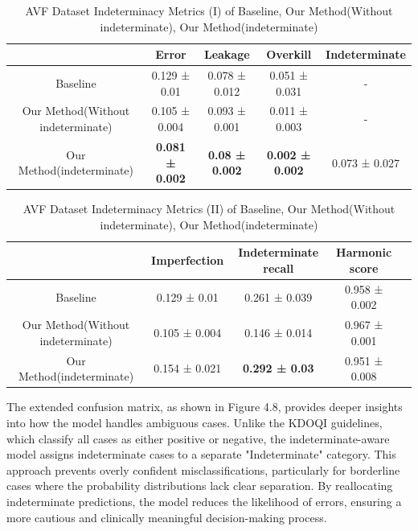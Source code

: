 \begin{table}[h]
\centering
\caption[AVF Dataset Indeterminacy Metrics (I) of Baseline, Our Method(Without indeterminate), Our Method(indeterminate)]{AVF Dataset Indeterminacy Metrics (I) of Baseline, Our Method(Without indeterminate), Our Method(indeterminate)}
\label{Indeterminacy Metrics(I) AVF}
\begin{tabular}{ccccc}
\toprule[1.1pt]
                      & Error & Leakage & Overkill & Indeterminate \\
\midrule[1.1pt]
\multirow{1}{*}{Baseline} & 0.129 ± 0.01 & 0.078 ± 0.012 & 0.051 ± 0.031 & - \\
\midrule
\multirow{1}{*}{Our Method(Without indeterminate)} & 0.105 ± 0.004 & 0.093 ± 0.001 & 0.011 ± 0.003 & - \\
\midrule
\multirow{1}{*}{Our Method(indeterminate)} & \textbf{0.081 ± 0.002} & \textbf{0.08 ± 0.002} & \textbf{0.002 ± 0.002} & 0.073 ± 0.027 \\

\bottomrule[1.1pt]
\end{tabular}
\end{table}

\begin{table}[H]
\centering
\caption[AVF Dataset Indeterminacy Metrics (II) of Baseline, Our Method(Without indeterminate), Our Method(indeterminate)]{AVF Dataset Indeterminacy Metrics (II) of Baseline, Our Method(Without indeterminate), Our Method(indeterminate)}
\label{Indeterminacy Metrics(II) AVF}
\begin{tabular}{ccccc}
\toprule[1.1pt]
                      & Imperfection & Indeterminate recall & Harmonic score \\
\midrule[1.1pt]
\multirow{1}{*}{Baseline} & 0.129 ± 0.01 & 0.261 ± 0.039 & 0.958 ± 0.002\\
\midrule
\multirow{1}{*}{Our Method(Without indeterminate)} & 0.105 ± 0.004 & 0.146 ± 0.014 & 0.967 ± 0.001 \\
\midrule
\multirow{1}{*}{Our Method(indeterminate)} & 0.154 ± 0.021 & \textbf{0.292 ± 0.03} & 0.951 ± 0.008 \\

\bottomrule[1.1pt]
\end{tabular}
\end{table}

The extended confusion matrix, as shown in Figure 4.8, provides deeper insights into how the model handles ambiguous cases. Unlike the KDOQI guidelines, which classify all cases as either positive or negative, the indeterminate-aware model assigns indeterminate cases to a separate "Indeterminate" category. This approach prevents overly confident misclassifications, particularly for borderline cases where the probability distributions lack clear separation. By reallocating indeterminate predictions, the model reduces the likelihood of errors, ensuring a more cautious and clinically meaningful decision-making process.

